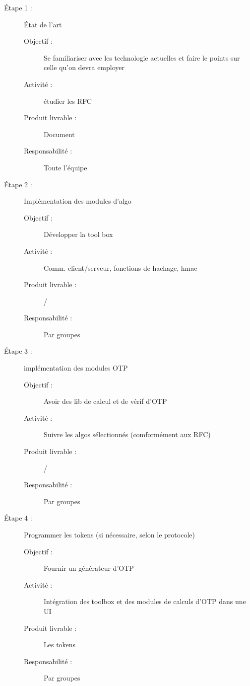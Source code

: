 \documentclass{../../res/univ-projet}
\begin{document}
	\begin{description}
	    \item [\'Etape 1 :] \'Etat de l'art
		    \begin{description}
		        \item [Objectif :] Se familiariser avec les technologie actuelles et faire le points sur celle qu'on devra employer
		        \item [Activit\'e :] \'etudier les RFC
		        \item [Produit livrable :] Document
		        \item [Responsabilit\'e :] Toute l'\'equipe
            \end{description}
	    \item [\'Etape 2 :] Impl\'ementation des modules d'algo
		    \begin{description}
		        \item [Objectif :] D\'evelopper la tool box
		        \item [Activit\'e :] Comm. client/serveur, fonctions de hachage, hmac
		        \item [Produit livrable :] /
		        \item [Responsabilit\'e :] Par groupes
		    \end{description}
	    \item [\'Etape 3 :] impl\'ementation des modules OTP
		    \begin{description}
		        \item [Objectif :] Avoir des lib de calcul et de vérif d'OTP
		        \item [Activit\'e :] Suivre les algos s\'electionn\'es (comform\'ement aux RFC)
		        \item [Produit livrable :] /
		        \item [Responsabilit\'e :] Par groupes
		    \end{description}
	    \item [\'Etape 4 :] Programmer les tokens (si n\'ecessaire, selon le protocole)
		    \begin{description}
		        \item [Objectif :] Fournir un g\'en\'erateur d'OTP
		        \item [Activit\'e :] Int\'egration des toolbox et des modules de calculs d'OTP dans une UI
		        \item [Produit livrable :] Les tokens
		        \item [Responsabilit\'e :]  Par groupes
		    \end{description}

\end{description}
\end{document}

